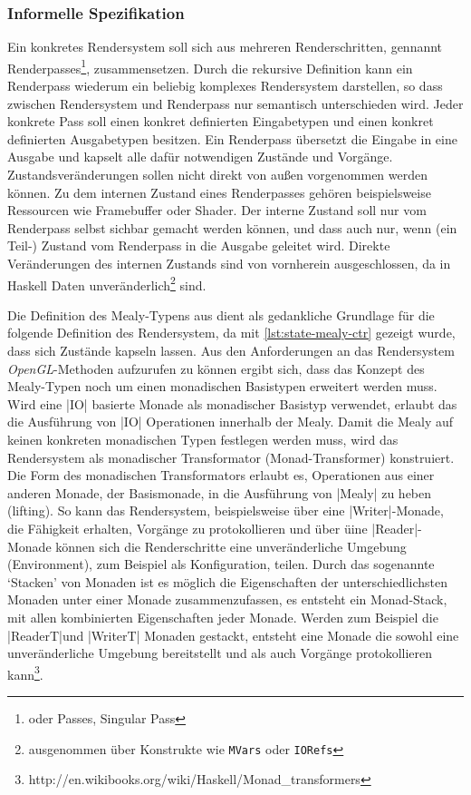 \subsubsection{Informelle Spezifikation}
Ein konkretes Rendersystem soll sich aus mehreren Renderschritten, gennannt Renderpasses\footnote{oder Passes, Singular Pass}, zusammensetzen. Durch die rekursive Definition kann ein Renderpass wiederum ein beliebig komplexes Rendersystem darstellen, so dass zwischen Rendersystem und Renderpass nur semantisch unterschieden wird. Jeder konkrete Pass soll einen konkret definierten Eingabetypen und einen konkret definierten Ausgabetypen besitzen. Ein Renderpass übersetzt die Eingabe in eine Ausgabe und kapselt alle dafür notwendigen Zustände und Vorgänge. Zustandsveränderungen sollen nicht direkt von außen vorgenommen werden können. Zu dem internen Zustand eines Renderpasses gehören beispielsweise Ressourcen wie Framebuffer oder Shader. Der interne Zustand soll nur vom Renderpass selbst sichbar gemacht werden können, und dass auch nur, wenn (ein Teil-) Zustand vom Renderpass in die Ausgabe geleitet wird. Direkte Veränderungen des internen Zustands sind von vornherein ausgeschlossen, da in Haskell Daten unveränderlich\footnote{ausgenommen über Konstrukte wie \texttt{MVars} oder \texttt{IORefs}} sind.

Die Definition des Mealy-Typens aus  dient als gedankliche Grundlage für die folgende Definition des Rendersystem, da mit \ref{lst:state-mealy-ctr} gezeigt wurde, dass sich Zustände kapseln lassen. Aus den Anforderungen an das Rendersystem \textit{OpenGL}-Methoden aufzurufen zu können ergibt sich, dass das Konzept des Mealy-Typen noch um einen monadischen Basistypen erweitert werden muss. Wird eine |IO| basierte Monade als monadischer Basistyp verwendet, erlaubt das die Ausführung von |IO| Operationen innerhalb der Mealy. Damit die Mealy auf keinen konkreten monadischen Typen festlegen werden muss, wird das Rendersystem als monadischer Transformator (Monad-Transformer) konstruiert. Die Form des monadischen Transformators erlaubt es, Operationen aus einer anderen Monade, der Basismonade, in die Ausführung von |Mealy| zu heben (lifting). So kann das Rendersystem, beispielsweise über eine |Writer|-Monade, die Fähigkeit erhalten, Vorgänge zu protokollieren und über üine |Reader|-Monade können sich die Renderschritte eine unveränderliche Umgebung (Environment), zum Beispiel als Konfiguration, teilen. Durch das sogenannte `Stacken' von Monaden ist es möglich die Eigenschaften der unterschiedlichsten Monaden unter einer Monade zusammenzufassen, es entsteht ein Monad-Stack, mit allen kombinierten Eigenschaften jeder Monade. Werden zum Beispiel die |ReaderT|\footnotemark und |WriterT| Monaden gestackt, entsteht eine Monade die sowohl eine unveränderliche Umgebung bereitstellt und als auch Vorgänge protokollieren kann\footnote{http://en.wikibooks.org/wiki/Haskell/Monad\_transformers}.

